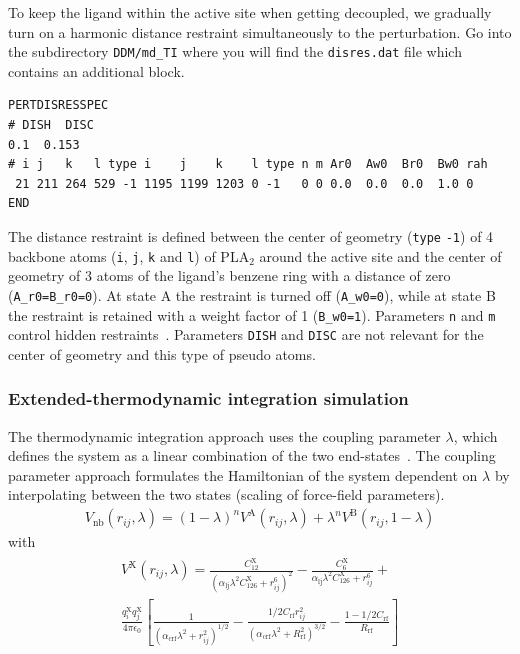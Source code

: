 To keep the ligand within the active site when getting decoupled, we gradually turn on a harmonic distance restraint simultaneously to the perturbation. Go into the subdirectory \texttt{DDM/md\_TI} where you will find the \texttt{disres.dat} file which contains an additional block.
\begin{lstlisting}
PERTDISRESSPEC
# DISH  DISC
0.1  0.153
# i j   k   l type i    j    k    l type n m Ar0  Aw0  Br0  Bw0 rah
 21 211 264 529 -1 1195 1199 1203 0 -1   0 0 0.0  0.0  0.0  1.0 0
END 
\end{lstlisting}

The distance restraint is defined between the center of geometry (\texttt{type} \texttt{-1}) of 4 backbone atoms (\texttt{i}, \texttt{j}, \texttt{k} and \texttt{l}) of PLA$_2$ around the active site and the center of geometry of 3 atoms of the ligand's benzene ring with a distance of zero (\texttt{A\_r0=B\_r0=0}). At state A the restraint is turned off (\texttt{A\_w0=0}), while at state B the restraint is retained with a weight factor of 1 (\texttt{B\_w0=1}). Parameters \texttt{n} and \texttt{m} control hidden 
restraints~\cite{Christen}. Parameters \texttt{DISH} and \texttt{DISC} are not relevant for the center of geometry and this type of pseudo atoms.

\subsubsection{Extended-thermodynamic integration simulation} \label{chapt:exTI}
The thermodynamic integration approach uses the coupling parameter $\lambda$, which defines the system as a linear combination of the two end-states~\cite{kirkwood_TI}. The coupling parameter approach formulates the Hamiltonian of the system dependent on $\lambda$ by interpolating between the two states (scaling of force-field parameters). \\

\begin{align}
\label{equ:ext_ti}
V_{\text{nb}}(r_{ij},\lambda) = (1-\lambda)^n V^{\text{A}}(r_{ij},\lambda) + \lambda^n V^{\text{B}}(r_{ij},1-\lambda)
\end{align}
with
\begin{align}\begin{split}
V^{\text{X}}(r_{ij},\lambda) = \frac{C_{12}^{\text{X}}}{(\alpha_{\text{lj}}\lambda^2 C_{126}^{\text{X}} + r_{ij}^6)^2} - \frac{C_{6}^{\text{X}}}{\alpha_{\text{lj}}\lambda^2 C_{126}^{\text{X}} + r_{ij}^6} + \\
 \frac{q_i^{\text{X}} q_j^{\text{X}}}{4 \pi \epsilon_0} \left \lbrack \frac{1}{(\alpha_{\text{crf}}\lambda^2 + r_{ij}^2)^{1/2}} - \frac{1/2 C_{\text{rf}}r_{ij}^2}{(\alpha_{\text{crf}} \lambda^2 + R_{\text{rf}}^2)^{3/2}} - \frac{1 - 1/2C_{\text{rf}}}{R_{\text{rf}}} \right \rbrack
\end{split}\end{align}

